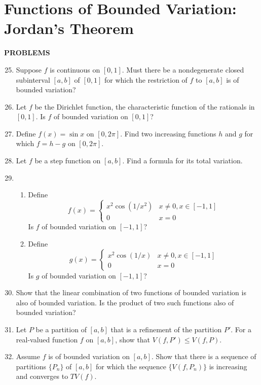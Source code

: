 \section{Functions of Bounded Variation: Jordan's Theorem}
\begin{center}
	\textbf{PROBLEMS}
\end{center}
\begin{enumerate}
	\setcounter{enumi}{24}
    \item Suppose $f$ is continuous on $[0,1]$. Must there be a nondegenerate closed subinterval $[a,b]$ of $[0,1]$ for which the restriction of $f$ to $[a,b]$ is of bounded variation?
    \item Let $f$ be the Dirichlet function, the characteristic function of the rationals in $[0,1]$. Is $f$ of bounded variation on $[0,1]$?
    \item Define $f(x)=\sin x$ on $[0,2\pi]$. Find two increasing functions $h$ and $g$ for which $f=h-g$ on $[0,2\pi]$.
    \item Let $f$ be a step function on $[a,b]$. Find a formula for its total variation.
    \item
    \begin{enumerate}[label=(\roman*),align=left]
        \item Define
        \[
            f(x)=
            \begin{cases}
                x^2\cos(1/x^2)&x\neq0,x\in[-1,1]\\
                0&x=0
            \end{cases}  
        \]
        Is $f$ of bounded variation on $[-1,1]$?
        \item Define
        \[
            g(x)=
            \begin{cases}
                x^2\cos(1/x)&x\neq0,x\in[-1,1]\\
                0&x=0
            \end{cases}  
        \]
        Is $g$ of bounded variation on $[-1,1]$?
    \end{enumerate}
    \item Show that the linear combination of two functions of bounded variation is also of bounded variation.
    Is the product of two such functions also of bounded variation?
    \item Let $P$ be a partition of $[a,b]$ that is a refinement of the partition $P'$. For a real-valued function $f$ on $[a,b]$, show that $V(f,P')\le V(f,P)$.
    \item Assume $f$ is of bounded variation on $[a,b]$. Show that there is a sequence of partitions $\{P_n\}$ of $[a,b]$ for which the sequence $\{V(f,P_n)\}$ is increasing and converges to $TV(f)$.

\end{enumerate}
